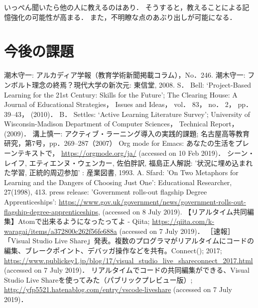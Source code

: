\documentclass{hissymp}
\begin{document}
いっぺん聞いたら他の人に教えるのはあり．
そうすると，教えることによる記憶強化の可能性が高まる．
また，不明瞭な点のあぶり出しが可能になる．

\section{今後の課題}
\label{sec:orgfcffc49}

\begin{thebibliography}{7}
 潮木守一: アルカディア学報（教育学術新聞掲載コラム），No．246.
 潮木守一: フンボルト理念の終焉？現代大学の新次元: 東信堂, 2008.
 S． Bell: ‘Project-Based Learning for the 21st Century: Skills for the Future’; The Clearing House: A Journal of Educational Strategies， Issues and Ideas， vol． 83， no． 2， pp． 39–43， (2010)．
 B． Settles: ‘Active Learning Literature Survey’; University of Wisconsin-Madison Department of Computer Sciences， Technical Report， (2009)．
 溝上慎一: アクティブ・ラーニング導入の実践的課題; 名古屋高等教育研究，第7号，pp．269--287（2007）
 Org mode for Emacs: あなたの生活をプレーンテキストで， \url{https://orgmode.org/ja/} (accessed on 10 Feb 2019)．
 シーン・レイフ, エティエンヌ・ウェンカー, 佐伯胖訳, 福島正人解説: '状況に埋め込まれた学習, 正統的周辺参加' : 産業図書, 1993.
 A. Sfard: 'On Two Metaphors for Learning and the Dangers of Choosing Just One': Educational Researcher, 27(1998), 413.
 press release: 'Government rolls-out flagship Degree Apprenticeships': \url{https://www.gov.uk/government/news/government-rolls-out-flagship-degree-apprenticeships}, (accessed on 8 July 2019).
 【リアルタイム共同編集】Atomで出来るようになったってよ - Qiita; \url{https://qiita.com/k-waragai/items/a372800c262f56fe688a} (accessed on 7 July 2019)．
  ［速報］「Visual Studio Live Share」発表。複数のプログラマがリアルタイムにコードの編集、ブレークポイント、デバッガ操作などを共有。Connect(); 2017; \url{https://www.publickey1.jp/blog/17/visual_studio_live_shareconnect_2017.html} (accessed on 7 July 2019)．
 リアルタイムでコードの共同編集ができる、Visual Studio Live Shareを使ってみた（パブリックプレビュー版）; \url{http://yfp5521.hatenablog.com/entry/vscode-liveshare} (accessed on 7 July 2019)．
\end{thebibliography}
\end{document}
